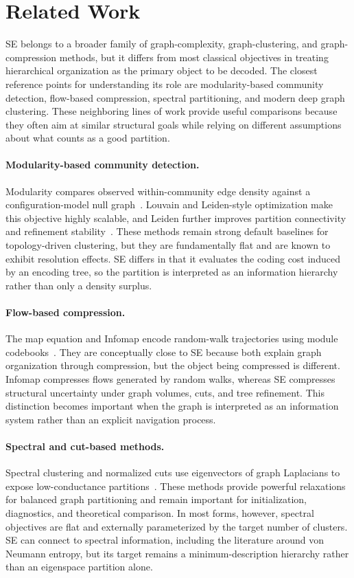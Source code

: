 \section{Related Work}
\label{sec:related}

SE belongs to a broader family of graph-complexity, graph-clustering, and
graph-compression methods, but it differs from most classical objectives in
treating hierarchical organization as the primary object to be decoded.
The closest reference points for understanding its role are modularity-based
community detection, flow-based compression, spectral partitioning, and modern
deep graph clustering.
These neighboring lines of work provide useful comparisons because they often
aim at similar structural goals while relying on different assumptions about
what counts as a good partition.

\paragraph{Modularity-based community detection.}
Modularity compares observed within-community edge density against a
configuration-model null graph~\cite{newman2004findingmodularity}.
Louvain and Leiden-style optimization make this objective highly scalable, and
Leiden further improves partition connectivity and refinement
stability~\cite{traag2019leiden}.
These methods remain strong default baselines for topology-driven clustering,
but they are fundamentally flat and are known to exhibit resolution effects.
SE differs in that it evaluates the coding cost induced by an encoding tree,
so the partition is interpreted as an information hierarchy rather than only a
density surplus.

\paragraph{Flow-based compression.}
The map equation and Infomap encode random-walk trajectories using module
codebooks~\cite{rosvall2008maps}.
They are conceptually close to SE because both explain graph organization
through compression, but the object being compressed is different.
Infomap compresses flows generated by random walks, whereas SE compresses
structural uncertainty under graph volumes, cuts, and tree refinement.
This distinction becomes important when the graph is interpreted as an
information system rather than an explicit navigation process.

\paragraph{Spectral and cut-based methods.}
Spectral clustering and normalized cuts use eigenvectors of graph Laplacians to
expose low-conductance partitions~\cite{shi2000normalized,ng2002spectral}.
These methods provide powerful relaxations for balanced graph partitioning and
remain important for initialization, diagnostics, and theoretical comparison.
In most forms, however, spectral objectives are flat and externally
parameterized by the target number of clusters.
SE can connect to spectral information, including the literature around
von Neumann entropy, but its target remains a minimum-description hierarchy
rather than an eigenspace partition alone.

